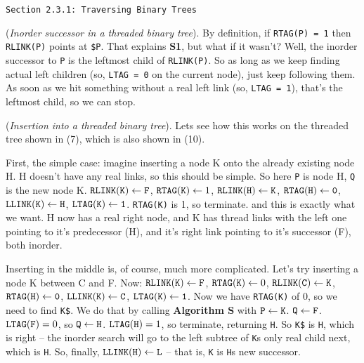 \vskip 0.3in
\centerline{\tt Section 2.3.1: Traversing Binary Trees}
\vskip 0.2in

 ({\it Inorder successor in a threaded 
binary tree}).\hfil\break
By definition, if {\tt RTAG(P) = 1} then {\tt RLINK(P)} points at {\tt \$P}.
That explains {\bf S1}, but what if it wasn't?  Well, the inorder successor
to {\tt P} is the leftmost child of {\tt RLINK(P)}.  So as long as we keep finding
actual left children (so, {\tt LTAG = 0} on the current node), just keep
following them.  As soon as we hit something without a real left link
(so, {\tt LTAG = 1}), that's the leftmost child, so we can stop.

\vskip 0.1in
 ({\it Insertion into a threaded binary tree}).
Lets see how this works on the threaded tree shown in (7), which
is also shown in (10).  

First, the simple case: imagine inserting a node K onto the already
existing node H.  H doesn't have any real links, so this should be simple.
So here {\tt P} is node H, {\tt Q} is the new node K.\hfil\break
{} ${\tt RLINK(K)} \gets {\tt F}$, ${\tt RTAG(K)} \gets 1$,
${\tt RLINK(H)} \gets {\tt K}$, ${\tt RTAG(H)} \gets {\tt 0}$, ${\tt LLINK(K)}
\gets {\tt H}$, ${\tt LTAG(K)} \gets {\tt 1}$. \hfil\break
{} {\tt RTAG(K)} is 1, so terminate.
\noindent and this is exactly what we want.  H now has a real right node,
and K has thread links with the left one pointing to it's predecessor (H),
and it's right link pointing to it's successor (F), both inorder.

Inserting in the middle is, of course, much more complicated.
Let's try inserting a node K between C and F.  Now:
 ${\tt RLINK(K)} \gets {\tt F}$, ${\tt RTAG(K)} \gets 0$,
${\tt RLINK(C)} \gets {\tt K}$, ${\tt RTAG(H)} \gets {\tt 0}$, ${\tt LLINK(K)}
\gets {\tt C}$, ${\tt LTAG(K)} \gets {\tt 1}$. \hfil\break
{} Now we have {\tt RTAG(K)} of 0, so we need to find {\tt K\$}.
We do that by calling {\bf Algorithm S} with ${\tt P} \gets {\tt K}$.\hfil\nobreak
{} ${\tt Q} \gets {\tt F}$.\hfil\nobreak
{} ${\tt LTAG(F)} = 0$, so ${\tt Q} \gets {\tt H}$.\hfil\nobreak
{} ${\tt LTAG(H)} = 1$, so terminate, returning {\tt H}.\hfil\nobreak
So {\tt K\$} is {\tt H}, which is right -- the inorder search will go to the left subtree
of {\tt K}s only real child next, which is {\tt H}.  So, finally,
${\tt LLINK(H)} \gets {\tt L}$ -- that is, {\tt K} is {\tt H}s new successor.

